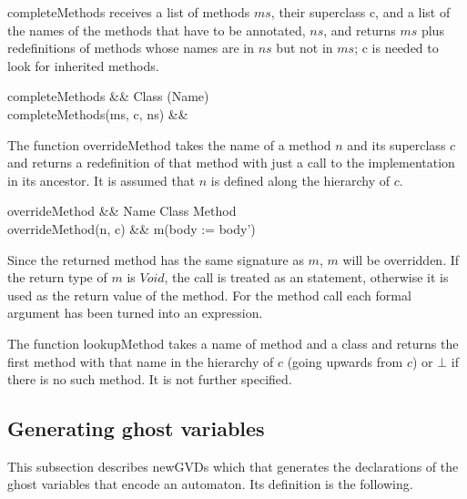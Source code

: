 \documentclass[a4paper,10pt]{article}
\begin{document}
\<completeMethods\> receives a list of methods $ms$, their superclass \<c\>, and a list of the names of the
methods that have to be annotated, $ns$, and returns $ms$ plus redefinitions of methods whose names are in
$ns$ but not in $ms$; \<c\> is needed to look for inherited methods.

\begin{haskell}\label{def:completeMethods}
completeMethods &\ofType& \Methods \sstimes Class \sstimes \powerset(Name) \ssto \Methods\\
completeMethods(ms, c, ns) &\eqdef&\relax
\end{haskell}

The function \<overrideMethod\> takes the name of a method $n$ and its superclass $c$ and returns a
redefinition of that method with just a call to the implementation in its ancestor.
It is assumed that $n$ is defined along the hierarchy of $c$.

\begin{haskell}\label{def:overrideMethod}
overrideMethod &\ofType& Name \times Class \to Method\\
overrideMethod(n, c) &\eqdef& m(body := body')
\end{haskell}

Since the returned method has the same signature as $m$, $m$ will be overridden.
If the return type of $m$ is $Void$, the call is treated as an statement, otherwise it is used as the return
value of the method.
For the method call each formal argument has been turned into an expression.

The function \<lookupMethod\> takes a name of method and a class and returns the first method with that name
in the hierarchy of $c$ (going upwards from $c$) or $\bot$ if there is no such method. It is not further
specified.


\subsection{Generating ghost variables}\label{sec:GenGVs}
This subsection describes \<newGVDs\> which that generates the declarations of the ghost variables that encode
an automaton. Its definition is the following.
\end{document}
